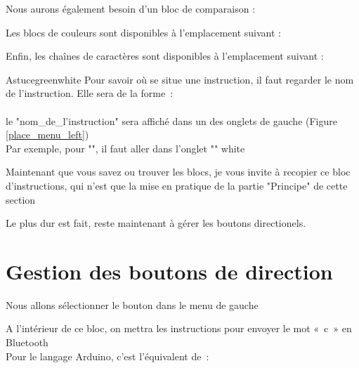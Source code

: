 
Nous aurons également besoin d'un bloc de comparaison : 



Les blocs de couleurs sont disponibles à l'emplacement suivant : 



Enfin, les chaînes de caractères sont disponibles à l'emplacement suivant : 



\begin{messageBox}{Astuce}{green}{white}{
Pour savoir où se situe une instruction, il faut
regarder le nom de l'instruction. Elle sera de la forme : \\

 \\

le "nom\_de\_l'instruction" sera affiché dans un des onglets de gauche (Figure  \ref{place_menu_left}) \\
Par exemple, pour "", il faut aller dans l'onglet "" 
}{white}
\end{messageBox}


Maintenant que vous savez ou trouver les blocs, je vous invite à recopier ce bloc d'instructions, qui n'est que la mise en pratique de la partie "Principe" de cette section


Le plus dur est fait, reste maintenant à gérer les boutons directionels.

\section{Gestion des boutons de direction}

Nous allons sélectionner le bouton  dans le menu de gauche

 A l'intérieur de ce bloc, on mettra les instructions pour envoyer le mot « c » en Bluetooth \\
Pour le langage Arduino, c'est l'équivalent de :

